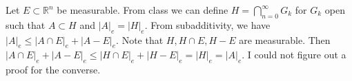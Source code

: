 \begin{solution}
  Let $E \subset \mathbb{R}^{n}$ be measurable.
  From class we can define $H = \bigcap_{n=0}^{\infty} G_{k}$ for $G_{k}$ open such that $A \subset H$ and $\left| A \right|_{e} = \left| H \right|_{e}$.
  From subadditivity, we have $\left| A \right|_{e} \leq  \left| A \cap E \right|_{e} + \left| A - E \right|_{e}$.
  Note that $H,H\cap E,H - E$ are measurable.
  Then $\left| A \cap E \right|_{e} + \left| A - E \right|_{e} \leq \left| H \cap E \right|_{e} + \left| H - E \right|_{e} = \left| H \right|_{e} = \left| A \right|_{e}$.
  I could not figure out a proof for the converse.
\end{solution}
